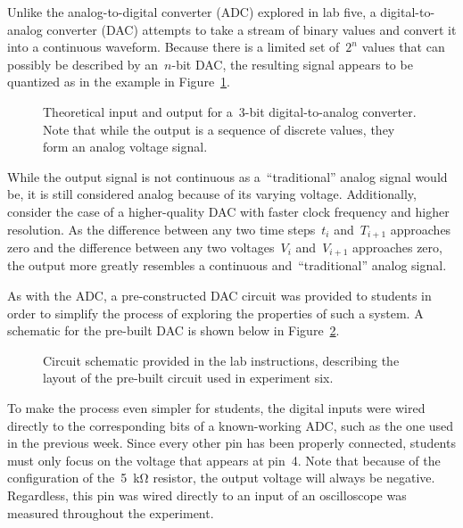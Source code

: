 Unlike the analog-to-digital converter (ADC) explored in lab five, a digital-to-analog converter (DAC) attempts to take a stream of binary values and convert it into a continuous waveform.  Because there is a limited set of~$2^n$ values that can possibly be described by an~$n$-bit DAC, the resulting signal appears to be quantized as in the example in Figure~\ref{fig:theory}.
%
\begin{figure}[H]
	\centering
	
	\parbox{.6\textwidth}{
	\caption[Theory Plot]{Theoretical input and output for a~3-bit digital-to-analog converter.  Note that while the output is a sequence of discrete values, they form an analog voltage signal.}
	\label{fig:theory}}
\end{figure}
%
While the output signal is not continuous as a~``traditional'' analog signal would be, it is still considered analog because of its varying voltage.  Additionally, consider the case of a higher-quality DAC with faster clock frequency and higher resolution.  As the difference between any two time steps~$t_i$ and~$T_{i+1}$ approaches zero and the difference between any two voltages~$V_i$ and~$V_{i+1}$ approaches zero, the output more greatly resembles a continuous and~``traditional'' analog signal.

As with the ADC, a pre-constructed DAC circuit was provided to students in order to simplify the process of exploring the properties of such a system.  A schematic for the pre-built DAC is shown below in Figure~\ref{fig:dacSchem}.
%
\begin{figure}[H]
	\centering
	
	\parbox{.6\textwidth}{
	\caption[Digital-to-Analog IC schematic]{Circuit schematic provided in the
	lab instructions, describing the layout of the pre-built circuit used in
	experiment six.}
	\label{fig:dacSchem}}
\end{figure}
%
To make the process even simpler for students, the digital inputs were wired directly to the corresponding bits of a known-working ADC, such as the one used in the previous week.  Since every other pin has been properly connected, students must only focus on the voltage that appears at pin~4.  Note that because of the configuration of the~\SI{5}{\kilo\ohm} resistor, the output voltage will always be negative.  Regardless, this pin was wired directly to an input of an oscilloscope was measured throughout the experiment.

